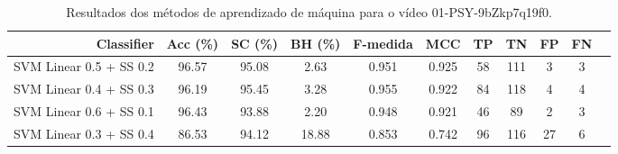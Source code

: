 \begin{table}[!htb]
\centering
\caption{Resultados dos métodos de aprendizado de máquina para o vídeo 01-PSY-9bZkp7q19f0.}
\label{tab:01-PSY-9bZkp7q19f0}
\begin{tabular}{r|c|c|c|c|c|c|c|c|c|c}
\hline\hline
Classifier & Acc (\%) & SC (\%) & BH (\%) & F-medida & MCC & TP & TN & FP & FN \\ \hline
SVM Linear 0.5 + SS 0.2 & 96.57 & 95.08 & 2.63 & 0.951 & 0.925 & 58 & 111 & 3 & 3 \\ 
SVM Linear 0.4 + SS 0.3 & 96.19 & 95.45 & 3.28 & 0.955 & 0.922 & 84 & 118 & 4 & 4 \\ 
SVM Linear 0.6 + SS 0.1 & 96.43 & 93.88 & 2.20 & 0.948 & 0.921 & 46 & 89 & 2 & 3 \\ 
SVM Linear 0.3 + SS 0.4 & 86.53 & 94.12 & 18.88 & 0.853 & 0.742 & 96 & 116 & 27 & 6 \\ 
\hline\hline
\end{tabular}
\end{table}
